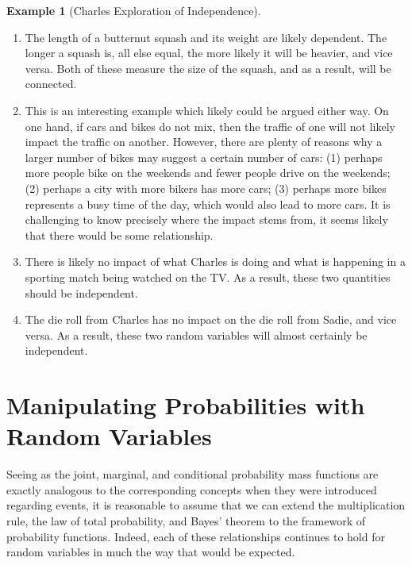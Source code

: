 \documentclass[
  letterpaper,
  DIV=11,
  numbers=noendperiod]{scrreprt}
\theoremstyle{definition}
\theoremstyle{definition}
\newtheorem{example}{Example}[chapter]
\theoremstyle{definition}
\theoremstyle{remark}
\begin{document}
\begin{example}[Charles Exploration of
Independence]
\begin{tcolorbox}[enhanced jigsaw, colback=white, colframe=quarto-callout-color-frame, arc=.35mm, leftrule=.75mm, rightrule=.15mm, opacityback=0, breakable, bottomrule=.15mm, left=2mm, toprule=.15mm]
\begin{enumerate}
\def\labelenumi{\alph{enumi}.}
\item
  The length of a butternut squash and its weight are likely dependent.
  The longer a squash is, all else equal, the more likely it will be
  heavier, and vice versa. Both of these measure the size of the squash,
  and as a result, will be connected.
\item
  This is an interesting example which likely could be argued either
  way. On one hand, if cars and bikes do not mix, then the traffic of
  one will not likely impact the traffic on another. However, there are
  plenty of reasons why a larger number of bikes may suggest a certain
  number of cars: (1) perhaps more people bike on the weekends and fewer
  people drive on the weekends; (2) perhaps a city with more bikers has
  more cars; (3) perhaps more bikes represents a busy time of the day,
  which would also lead to more cars. It is challenging to know
  precisely where the impact stems from, it seems likely that there
  would be some relationship.
\item
  There is likely no impact of what Charles is doing and what is
  happening in a sporting match being watched on the TV. As a result,
  these two quantities should be independent.
\item
  The die roll from Charles has no impact on the die roll from Sadie,
  and vice versa. As a result, these two random variables will almost
  certainly be independent.
\end{enumerate}

\end{tcolorbox}

\end{example}

\section{Manipulating Probabilities with Random
Variables}\label{manipulating-probabilities-with-random-variables}

Seeing as the joint, marginal, and conditional probability mass
functions are exactly analogous to the corresponding concepts when they
were introduced regarding events, it is reasonable to assume that we can
extend the multiplication rule, the law of total probability, and Bayes'
theorem to the framework of probability functions. Indeed, each of these
relationships continues to hold for random variables in much the way
that would be expected.
\end{document}

